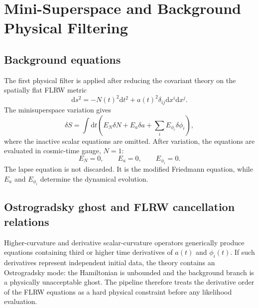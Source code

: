 \documentclass[aps,prd,twocolumn,superscriptaddress,nofootinbib,longbibliography]{revtex4-2}
\newcommand{\dd}{\mathrm{d}}
\begin{document}
\section{Mini-Superspace and Background Physical Filtering}
\label{sec:ghost}

\subsection{Background equations}
\label{subsec:background-eom}

The first physical filter is applied after reducing the covariant theory on the spatially flat FLRW metric
\begin{equation}
\dd s^2=-N(t)^2\dd t^2+a(t)^2\delta_{ij}\dd x^i\dd x^j .
\label{eq:flrw}
\end{equation}
The minisuperspace variation gives
\begin{equation}
\delta S=\int \dd t\left(E_N\delta N+E_a\delta a+\sum_iE_{\phi_i}\delta\phi_i\right),
\label{eq:variation}
\end{equation}
where the inactive scalar equations are omitted.  After variation, the equations are evaluated in cosmic-time gauge, $N=1$:
\begin{equation}
E_N=0,\qquad E_a=0,\qquad E_{\phi_i}=0 .
\label{eq:eom-set}
\end{equation}
The lapse equation is not discarded.  It is the modified Friedmann equation, while $E_a$ and $E_{\phi_i}$ determine the dynamical evolution.


\subsection{Ostrogradsky ghost and FLRW cancellation relations}
\label{subsec:ostro}

Higher-curvature and derivative scalar-curvature operators generically produce equations containing third or higher time derivatives of $a(t)$ and $\phi_i(t)$.  If such derivatives represent independent initial data, the theory contains an Ostrogradsky mode: the Hamiltonian is unbounded and the background branch is a physically unacceptable ghost\cite{Ostrogradsky1850}.  The pipeline therefore treats the derivative order of the FLRW equations as a hard physical constraint before any likelihood evaluation.
\end{document}

